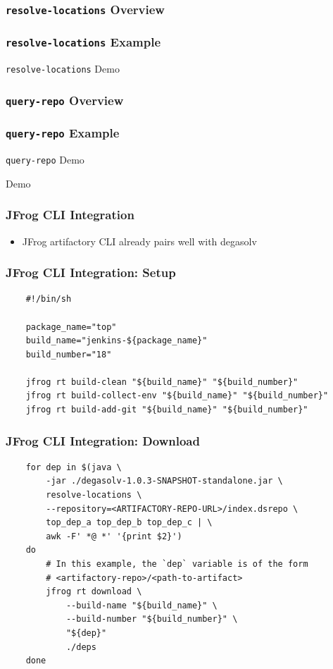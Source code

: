 \documentclass{beamer}
\begin{document}
\begin{frame}
  \frametitle{\texttt{resolve-locations} Overview}
\end{frame}
\begin{frame}
  \frametitle{\texttt{resolve-locations} Example}
\end{frame}
\begin{frame}
  \centerline{\color{blue}\Large \texttt{resolve-locations} Demo}
\end{frame}
\begin{frame}
  \frametitle{\texttt{query-repo} Overview}
\end{frame}
\begin{frame}
  \frametitle{\texttt{query-repo} Example}
\end{frame}
\begin{frame}
  \centerline{\color{blue}\Large \texttt{query-repo} Demo}
\end{frame}
\begin{frame}
  \centerline{\color{blue}\Large Demo}
\end{frame}
\begin{frame}[fragile]
  \frametitle{JFrog CLI Integration}
  \begin{itemize}
  \item JFrog artifactory CLI already pairs well with degasolv
  \end{itemize}
\end{frame}
\begin{frame}[fragile]
\frametitle{JFrog CLI Integration: Setup}
\begin{verbatim}
    #!/bin/sh

    package_name="top"
    build_name="jenkins-${package_name}"
    build_number="18"

    jfrog rt build-clean "${build_name}" "${build_number}"
    jfrog rt build-collect-env "${build_name}" "${build_number}"
    jfrog rt build-add-git "${build_name}" "${build_number}"
\end{verbatim}
\end{frame}
\begin{frame}[fragile]
\frametitle{JFrog CLI Integration: Download}
\begin{verbatim}
    for dep in $(java \
        -jar ./degasolv-1.0.3-SNAPSHOT-standalone.jar \
        resolve-locations \
        --repository=<ARTIFACTORY-REPO-URL>/index.dsrepo \
        top_dep_a top_dep_b top_dep_c | \
        awk -F' *@ *' '{print $2}')
    do
        # In this example, the `dep` variable is of the form
        # <artifactory-repo>/<path-to-artifact>
        jfrog rt download \
            --build-name "${build_name}" \
            --build-number "${build_number}" \
            "${dep}"
            ./deps
    done
\end{verbatim}
\end{frame}
\end{document}
